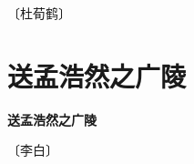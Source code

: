 \documentclass[12pt,UTF-8,openany,fontset=none]{ctexbook}
\begin{document}
\begin{center}
    \vspace{10pt}
    
    \begin{large}
        
        〔杜荀鹤〕
        
    \end{large}
    
    \vspace{8pt}
    
    \begin{huge}
        
        \phantom{。}

        \phantom{。}
        
        \phantom{。}

        \phantom{。}
        
    \end{huge}
    
\end{center}

\vspace{8pt}
\clearpage


\section{送孟浩然之广陵}



\begin{center}
    {\bfseries 送孟浩然之广陵}
\end{center}

\begin{center}
    \vspace{10pt}
    
    \begin{large}
        
        〔李白〕
        
    \end{large}
    
    \vspace{8pt}
    
    \begin{huge}
        
        \phantom{。}

        \phantom{。}
        
        \phantom{。}

        \phantom{。}
        
    \end{huge}
    
\end{center}
\end{document}
